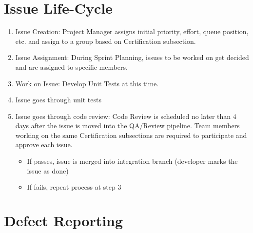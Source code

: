 \documentclass[letterpaper,10pt,english,openany,oneside]{sphinxmanual}
\begin{document}
\section{Issue Life-Cycle}
\label{\detokenize{test_plan/issue_management:issue-life-cycle}}\begin{enumerate}
%
\item {} 
Issue Creation: Project Manager assigns initial priority, effort, queue position, etc. and assign to a group based on Certification subsection.

\item {} 
Issue Assignment: During Sprint Planning, issues to be worked on get decided and are assigned to specific members.

\item {} 
Work on Issue: Develop Unit Tests at this time.

\item {} 
Issue goes through unit tests

\item {} 
Issue goes through code review: Code Review is scheduled no later than 4 days after the issue is moved into the QA/Review pipeline. Team members working on the same Certification subsections are required to participate and approve each issue.
\begin{itemize}
\item {} 
If passes, issue is merged into integration branch (developer marks the issue as done)

\item {} 
If fails, repeat process at step 3

\end{itemize}

\end{enumerate}


\section{Defect Reporting}
\label{\detokenize{test_plan/issue_management:defect-reporting}}
\end{document}
